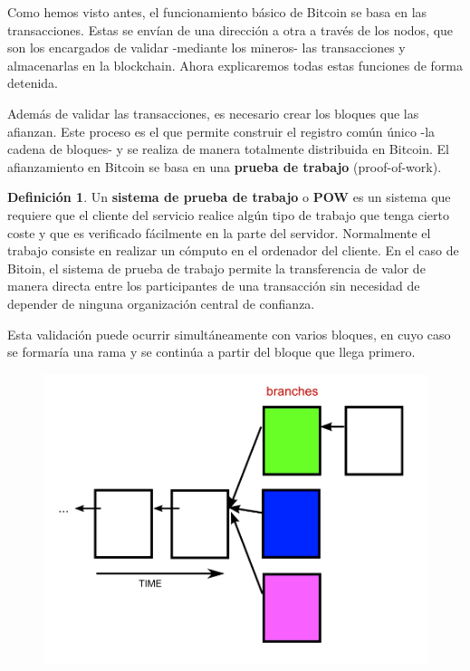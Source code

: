 \documentclass[twoside]{article}
\theoremstyle{definition}
\newtheorem{defi}[teorema]{Definición}
\begin{document}
Como hemos visto antes, el funcionamiento básico de Bitcoin se basa en las transacciones. Estas se envían de una dirección a otra a través de los nodos, que son los encargados de validar -mediante los mineros- las transacciones y almacenarlas en la blockchain. Ahora explicaremos todas estas funciones de forma detenida.

Además de validar las transacciones, es necesario crear los bloques que las afianzan. Este proceso es el que permite construir el registro común único  -la cadena de bloques- y se realiza de manera totalmente distribuida en Bitcoin. El afianzamiento en Bitcoin se basa en una \textbf{prueba de trabajo} (proof-of-work). 
\begin{defi} Un \textbf{sistema de prueba de trabajo} o \textbf{POW} es un sistema que requiere que el cliente del servicio realice algún tipo de trabajo que tenga cierto coste y que es verificado fácilmente en la parte del servidor. Normalmente el trabajo consiste en realizar un cómputo en el ordenador del cliente. En el caso de Bitoin, el sistema de prueba de trabajo permite la transferencia de valor de manera directa entre los participantes de una transacción sin necesidad de depender de ninguna organización central de confianza. 
\end{defi}
Esta validación puede ocurrir simultáneamente con varios bloques, en cuyo caso se formaría una rama y se continúa a partir del bloque que llega primero.
\begin{figure}[h!]
\includegraphics[scale=0.45]{rama}
\end{figure}
\end{document}
